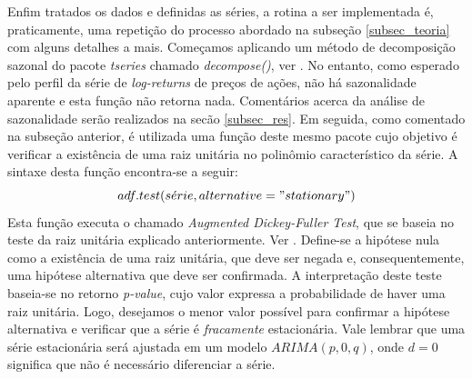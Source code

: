 \documentclass[12pt]{article}
\begin{document}
Enfim tratados os dados e definidas as séries, a rotina a ser implementada é, praticamente, uma repetição do processo abordado na subseção \ref{subsec_teoria} com alguns detalhes a mais. Começamos aplicando um método de decomposição sazonal do pacote \emph{tseries} chamado \emph{decompose()}, ver \cite{CRANR}. No entanto, como esperado pelo perfil da série de \textit{log-returns} de preços de ações, não há sazonalidade aparente e esta função não retorna nada. Comentários acerca da análise de sazonalidade serão realizados na secão \ref{subsec_res}. Em seguida, como comentado na subseção anterior, é utilizada uma função deste mesmo pacote cujo objetivo é verificar a existência de uma raiz unitária no polinômio característico da série. A sintaxe desta função encontra-se a seguir:
\begin{equation*}\label{eq:adf}
adf.test(s\acute{e}rie, alternative = "stationary")
\end{equation*}
Esta função executa o chamado \emph{Augmented Dickey-Fuller Test}, que se baseia no teste da raiz unitária explicado anteriormente. Ver \cite{Tsay}. Define-se a hipótese nula como a existência de uma raiz unitária, que deve ser negada e, consequentemente, uma hipótese alternativa que deve ser confirmada. A interpretação deste teste baseia-se no retorno \emph{p-value}, cujo valor expressa a probabilidade de haver uma raiz unitária. Logo, desejamos o menor valor possível para confirmar a hipótese alternativa e verificar que a série é \textit{fracamente} estacionária. Vale lembrar que uma série estacionária será ajustada em um modelo $ARIMA(p,0,q)$, onde $d=0$ significa que não é necessário diferenciar a série.
\end{document}
